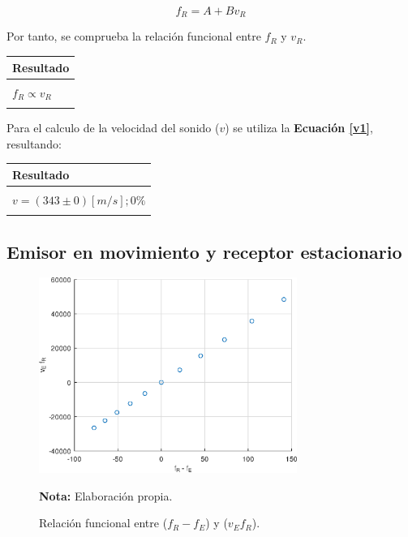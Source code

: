 \documentclass[letter,11pt]{article}
\newcommand{\source}[1]{\vspace{-11pt} \caption*{\small{\textbf{Nota:} {#1}}}}
\begin{document}
\begin{equation*}
    f_R = A + B v_R
\end{equation*}
\vspace{0.10cm}

Por tanto, se comprueba la relación funcional entre $f_R$ y $v_R$.

\begin{center}
\begin{tabular}{|>{\centering}m{9.2cm}<{\centering}|}
\hline
\textbf{Resultado} 
\tabularnewline \hline
\\
$f_R \propto v_R$ \tabularnewline
\\
\hline
\end{tabular}
\end{center}

Para el calculo de la velocidad del sonido ($v$) se utiliza la
\textbf{Ecuación \ref{v1}}, resultando:

\begin{center}
\begin{tabular}{|>{\centering}m{9.2cm}<{\centering}|}
\hline
\textbf{Resultado} 
\tabularnewline \hline
\\
$v = (343 \pm 0) [m/s]; 0\%$ \tabularnewline
\\
\hline
\end{tabular}
\end{center}

\subsection{Emisor en movimiento y receptor estacionario}

\begin{figure}
\centering
\includegraphics[width=0.75\textwidth]{resources/o2.eps}
\caption{Relación funcional entre ($f_R - f_E$) y ($v_E f_R$).}
\label{figura6}
\source{Elaboración propia.}
\end{figure}
\end{document}
